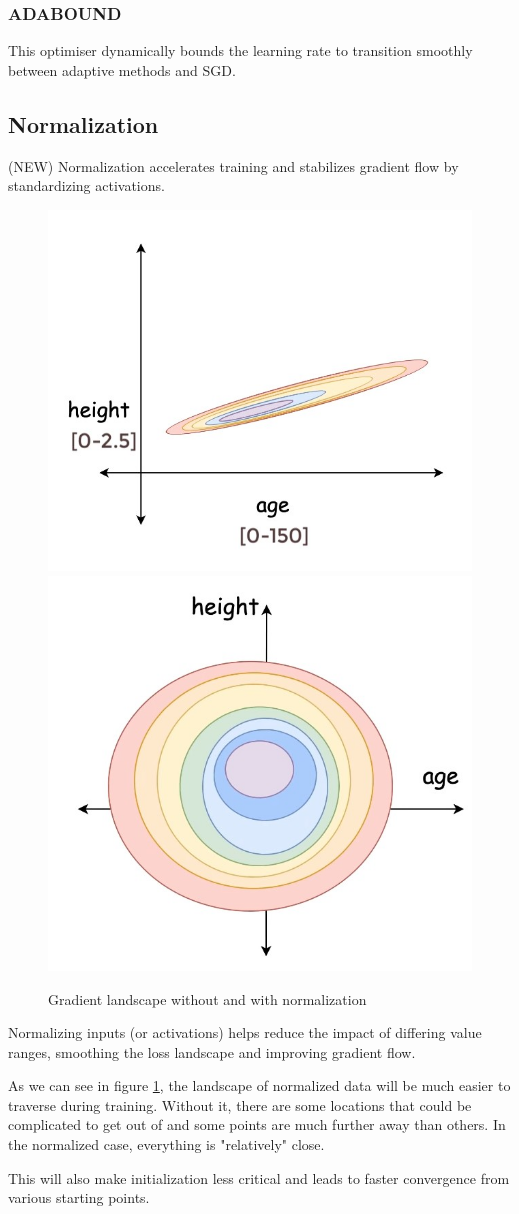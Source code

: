\documentclass{article}
\begin{document}
\subsubsection{ADABOUND}
This optimiser dynamically bounds the learning rate to transition smoothly between adaptive methods and SGD.

\subsection{Normalization} (NEW)
Normalization accelerates training and stabilizes gradient flow by standardizing activations.

\begin{figure}
    \centering
    \includegraphics[width=0.4\linewidth]{graphics/batchnorm_exp01.jpg}
    \includegraphics[width=0.4\linewidth]{graphics/batchnorm_exp02.jpg}
    \caption{Gradient landscape without and with normalization}
    \label{fig:enter-label}
\end{figure}

Normalizing inputs (or activations) helps reduce the impact of differing value ranges, smoothing the loss landscape and improving gradient flow.

As we can see in figure \ref{fig:enter-label}, the landscape of normalized data will be much easier to traverse during training. Without it, there are some locations that could be complicated to get out of and some points are much further away than others. In the normalized case, everything is "relatively" close.

This will also make initialization less critical and leads to faster convergence from various starting points.
\end{document}
